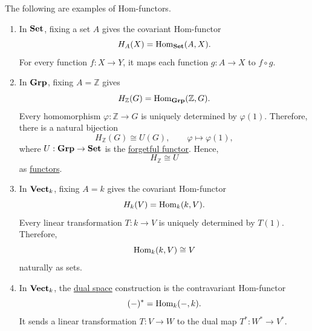 	\begin{example}
	  \label{ex:hom-functors}
		The following are examples of Hom-functors.
		\begin{enumerate}
			\item In $\operatorname{\mathbf{Set}}$, fixing a set $A$ gives the
				covariant Hom-functor
				\begin{equation}
					H_A(X) = \operatorname{Hom}_{\operatorname{\mathbf{Set}}}(A,X).
				\end{equation}
				For every function $f: X \to Y$, it maps
				each function $g: A \to X$ to $f \circ g$.

			\item In $\operatorname{\mathbf{Grp}}$, fixing $A = \mathbb Z$ gives
				\begin{equation}
					H_{\mathbb Z}(G)
					= \operatorname{Hom}_{\operatorname{\mathbf{Grp}}}(\mathbb Z,G).
				\end{equation}
				Every homomorphism $\varphi: \mathbb Z \to G$
				is uniquely determined by $\varphi(1)$.
				Therefore, there is a natural bijection
				\begin{equation}
					H_{\mathbb Z}(G) \cong U(G),
					\qquad \varphi \mapsto \varphi(1),
				\end{equation}
				where $U: \operatorname{\mathbf{Grp}} \to \operatorname{\mathbf{Set}}$ is the \hyperref[def:forgetful-functor]{forgetful
				functor}. Hence,
				\begin{equation}
					H_{\mathbb Z} \cong U
				\end{equation}
				as \hyperref[def:functor]{functors}.

			\item In $\operatorname{\mathbf{Vect}}_k$, fixing $A=k$ gives the
				covariant Hom-functor
				\begin{equation}
					H_k(V) = \operatorname{Hom}_k(k,V).
				\end{equation}
				Every linear transformation $T:k\to V$
				is uniquely determined by $T(1)$.
				Therefore,
				\begin{equation}
					\operatorname{Hom}_k(k,V) \cong V
				\end{equation}
				naturally as sets.

			\item In $\operatorname{\mathbf{Vect}}_k$, the \hyperref[lin-def:dual-space]{dual space} construction
				is the contravariant Hom-functor
				\begin{equation}
					(-)^* = \operatorname{Hom}_k(-,k).
				\end{equation}
				It sends a linear transformation $T:V\to W$
				to the dual map $T^*:W^*\to V^*$.
		\end{enumerate}
	\end{example}

